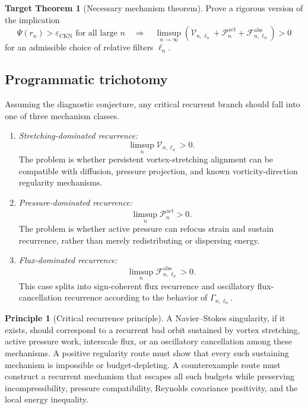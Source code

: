 \documentclass[11pt]{article}
\numberwithin{equation}{section}
\theoremstyle{plain}
\theoremstyle{definition}
\newtheorem{principle}[theorem]{Principle}
\newtheorem{target}[theorem]{Target Theorem}
\theoremstyle{remark}
\newcommand{\eps}{\varepsilon}
\newcommand{\CKN}{\mathrm{CKN}}
\newcommand{\Vort}{\mathcal V}
\newcommand{\Flux}{\mathcal F}
\newcommand{\Press}{\mathcal P}
\newcommand{\act}{\mathrm{act}}
\newcommand{\absop}{\mathrm{abs}}
\begin{document}
\begin{target}[Necessary mechanism theorem]
Prove a rigorous version of the implication
\[
    \Psi(r_n)>\eps_{\CKN}\text{ for all large }n
    \quad\Longrightarrow\quad
    \limsup_{n\to\infty}
    \left(
    \Vort_{n,\ell_n}
    +\Press^{\act}_{n}
    +\Flux^{\absop}_{n,\ell_n}
    \right)>0
\]
for an admissible choice of relative filters \(\ell_n\).
\end{target}

\subsection{Programmatic trichotomy}

Assuming the diagnostic conjecture, any critical recurrent branch should fall into one of three mechanism classes.

\begin{enumerate}[label=\textup{(\roman*)}]
\item \emph{Stretching-dominated recurrence:}
\[
    \limsup_n \Vort_{n,\ell_n}>0.
\]
The problem is whether persistent vortex-stretching alignment can be compatible with diffusion, pressure projection, and known vorticity-direction regularity mechanisms.

\item \emph{Pressure-dominated recurrence:}
\[
    \limsup_n \Press^{\act}_n>0.
\]
The problem is whether active pressure can refocus strain and sustain recurrence, rather than merely redistributing or dispersing energy.

\item \emph{Flux-dominated recurrence:}
\[
    \limsup_n \Flux^{\absop}_{n,\ell_n}>0.
\]
This case splits into sign-coherent flux recurrence and oscillatory flux-cancellation recurrence according to the behavior of \(\Gamma_{n,\ell_n}\).
\end{enumerate}

\begin{principle}[Critical recurrence principle]
A Navier--Stokes singularity, if it exists, should correspond to a recurrent bad orbit sustained by vortex stretching, active pressure work, interscale flux, or an oscillatory cancellation among these mechanisms.  A positive regularity route must show that every such sustaining mechanism is impossible or budget-depleting.  A counterexample route must construct a recurrent mechanism that escapes all such budgets while preserving incompressibility, pressure compatibility, Reynolds covariance positivity, and the local energy inequality.
\end{principle}
\end{document}
